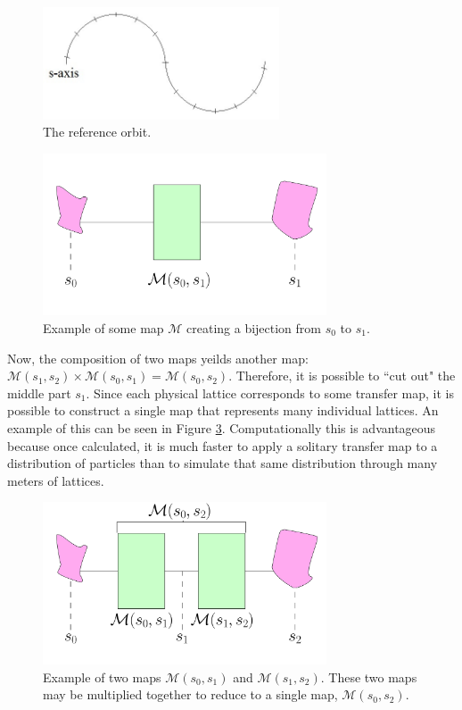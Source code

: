 \begin{figure}[h!]
\centering
\includegraphics*[width=70mm]{./Figures/saxis}
\caption{The reference orbit.}
\label{fig:saxis}
\end{figure}


\begin{figure}[h!]
  \centering
    \includegraphics[width=0.75\textwidth]{Figures/matrix_element_example_1} 
  \caption{Example of some map $\mathcal{M}$ creating a bijection from $s_0$ to $s_1$.}
  \label{fig:matrix_element_example_1}
\end{figure}

Now, the composition of two maps yeilds another map: $\mathcal{M}(s_1 , s_2)\times \mathcal{M}(s_0 , s_1) = \mathcal{M}(s_0 , s_2)$. Therefore, it is possible to ``cut out" the middle part $s_1$. Since each physical lattice corresponds to some transfer map, it is possible to construct a single map that represents many individual lattices. An example of this can be seen in Figure \ref{fig:matrix_element_example_2}. Computationally this is advantageous because once calculated, it is much faster to apply a solitary transfer map to a distribution of particles than to simulate that same distribution through many meters of lattices.
\begin{figure}[h!]
  \centering
    \includegraphics[width=0.75\textwidth]{Figures/matrix_element_example_2} 
  \caption{Example of two maps $\mathcal{M}(s_0,s_1)$ and $\mathcal{M}(s_1,s_2)$. These two maps may be multiplied together to reduce to a single map, $\mathcal{M}(s_0,s_2)$.}
  \label{fig:matrix_element_example_2}
\end{figure}

